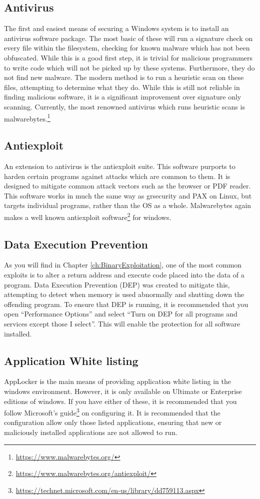 \documentclass[a4paper,11pt]{report}
\begin{document}
		\subsection{Antivirus}
			The first and easiest means of securing a Windows system is to install an antivirus software package. 
			The most basic of these will run a signature check on every file within the filesystem, checking for known malware which has not been obfuscated. 
			While this is a good first step, it is trivial for malicious programmers to write code which will not be picked up by these systems. 
			Furthermore, they do not find new malware.
			The modern method is to run a heuristic scan on these files, attempting to determine what they do. 
			While this is still not reliable in finding malicious software, it is a significant improvement over signature only scanning. 
			Currently, the most renowned antivirus which runs heuristic scans is malwarebytes.\footnote{\url{https://www.malwarebytes.org/}}

		\subsection{Antiexploit}
			An extension to antivirus is the antiexploit suite. 
			This software purports to harden certain programs against attacks which are common to them. 
			It is designed to mitigate common attack vectors such as the browser or PDF reader. 
			This software works in much the same way as grsecurity and PAX on Linux, but targets individual programs, rather than the OS as a whole. 
			Malwarebytes again makes a well known antiexploit software\footnote{\url{https://www.malwarebytes.org/antiexploit/}} for windows. 
		\subsection{Data Execution Prevention}
			As you will find in Chapter \ref{ch:BinaryExploitation}, 
			one of the most common exploits is to alter a return address and execute code placed into the data of a program. 
			Data Execution Prevention (DEP) was created to mitigate this, attempting to detect when memory is used abnormally and shutting down the offending program. 
			To ensure that DEP is running, it is recommended that you open ``Performance Options'' and select ``Turn on DEP for all programs and services except those I select''. 
			This will enable the protection for all software installed. 
		\subsection{Application White listing}
			AppLocker is the main means of providing application white listing in the windows environment. 
			However, it is only available on Ultimate or Enterprise editions of windows. 
			If you have either of these, it is recommended that you follow Microsoft's guide\footnote{\url{https://technet.microsoft.com/en-us/library/dd759113.aspx}} on configuring it. 
			It is recommended that the configuration allow only those listed applications,
			ensuring that new or maliciously installed applications are not allowed to run. 
\end{document}
